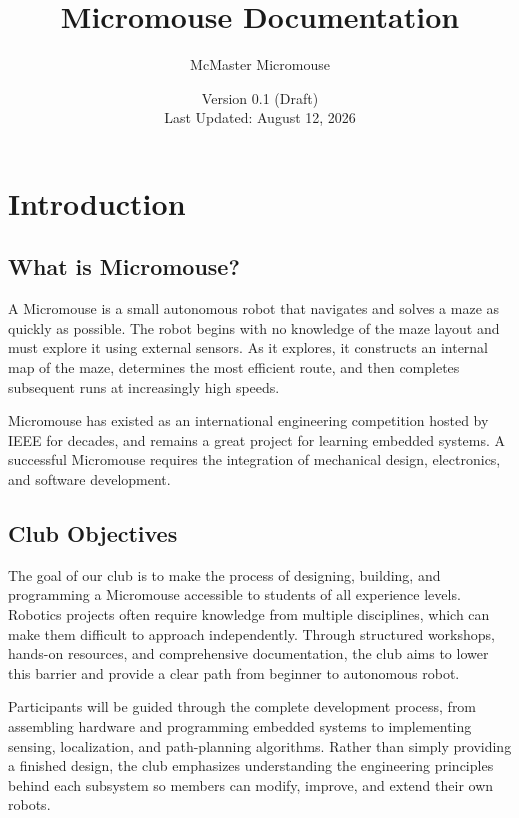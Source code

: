 \documentclass[11pt]{report}
\title{Micromouse Documentation}
\author{McMaster Micromouse}
\date{
	Version 0.1 (Draft)\\
	Last Updated: August 12, 2026
}
\begin{document}
\maketitle
\tableofcontents
\clearpage

\chapter{Introduction}
    \section{What is Micromouse?}
	A Micromouse is a small autonomous robot that navigates and solves a maze as quickly as
	possible. The robot begins with no knowledge of the maze layout and must explore it using 
	external sensors. As it explores, it constructs an internal map of the maze, determines 
	the most efficient route, and then completes subsequent runs at increasingly high speeds.
	\newline

	\noindent
	Micromouse has existed as an international engineering competition hosted by IEEE for 
	decades, and remains a great project for learning embedded systems. A successful Micromouse
	requires the integration of mechanical design, electronics, and software development. 

    \section{Club Objectives}
	The goal of our club is to make the process of designing, building, and programming a 
	Micromouse accessible to students of all experience levels. Robotics projects often require 
	knowledge from multiple disciplines, which can make them difficult 	to approach independently. 
	Through structured workshops, hands-on resources, and comprehensive documentation, the club 
	aims to lower this barrier and provide a clear path from beginner to autonomous robot.
	\newline

	\noindent
	Participants will be guided through the complete development process, from assembling hardware
	and programming embedded systems to implementing sensing, localization, and path-planning 
	algorithms. Rather than simply providing a finished design, the club emphasizes understanding 
	the engineering principles behind each subsystem so members can modify, improve, 
	and extend their own robots.
	\newline
\end{document}

